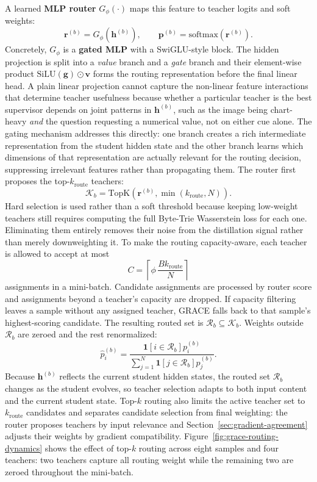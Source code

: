 A learned \textbf{MLP router} \(G_{\phi}(\cdot)\) maps this feature to teacher logits
and soft weights:
\[
\mathbf{r}^{(b)}=G_{\phi}(\mathbf{h}^{(b)}),
\qquad
\mathbf{p}^{(b)}=\mathrm{softmax}(\mathbf{r}^{(b)}).
\]
Concretely, \(G_{\phi}\) is a \textbf{gated MLP} with a SwiGLU-style block. The
hidden projection is split into a \textit{value} branch and a \textit{gate}
branch and their element-wise product
\(\mathrm{SiLU}(\mathbf{g})\odot\mathbf{v}\) forms the routing
representation before the final linear head.
A plain linear projection cannot capture the non-linear feature interactions
that determine teacher usefulness because whether a particular teacher is the best
supervisor depends on joint patterns in \(\mathbf{h}^{(b)}\), such as the
image being chart-heavy \textit{and} the question requesting a numerical
value, not on either cue alone.
The gating mechanism addresses this directly: one branch creates a rich
intermediate representation from the student hidden state and the other
branch learns which dimensions of that representation are actually relevant
for the routing decision, suppressing irrelevant features rather than
propagating them.
The router first proposes the top-\(k_{\mathrm{route}}\) teachers:
\[
\mathcal{K}_b=\mathrm{TopK}(\mathbf{r}^{(b)},\min(k_{\mathrm{route}},N)).
\]
Hard selection is used rather than a soft threshold because keeping low-weight
teachers still requires computing the full Byte-Trie Wasserstein loss for each
one. Eliminating them entirely removes their noise from the distillation signal
rather than merely downweighting it.
To make the routing capacity-aware, each teacher is allowed to accept at most
\[
C=\left\lceil \phi\,\frac{B k_{\mathrm{route}}}{N}\right\rceil
\]
assignments in a mini-batch. Candidate assignments are processed by router
score and assignments beyond a teacher's capacity are dropped. If capacity
filtering leaves a sample without any assigned teacher, GRACE falls back to
that sample's highest-scoring candidate. The resulting routed set is
\(\mathcal{R}_b\subseteq\mathcal{K}_b\).
Weights outside \(\mathcal{R}_b\) are zeroed and the rest renormalized:
\begin{equation}
\hat{p}_i^{(b)}
=
\frac{\mathbf{1}[i\in\mathcal{R}_b] p_i^{(b)}}
{\sum_{j=1}^{N}\mathbf{1}[j\in\mathcal{R}_b] p_j^{(b)}}.
\label{eq:constrained_gate_weights}
\end{equation}
Because \(\mathbf{h}^{(b)}\) reflects the current student hidden states,
the routed set \(\mathcal{R}_b\) changes as the student evolves, so teacher
selection adapts to both input content and the current student state.
Top-\(k\) routing also limits the active teacher set to
\(k_{\mathrm{route}}\) candidates and separates candidate selection from final
weighting: the router proposes teachers by input relevance and
Section~\ref{sec:gradient-agreement} adjusts their weights by gradient
compatibility. Figure~\ref{fig:grace-routing-dynamics} shows the effect of top-\(k\)
routing across eight samples and four teachers: two teachers capture all
routing weight while the remaining two are zeroed throughout the mini-batch.

